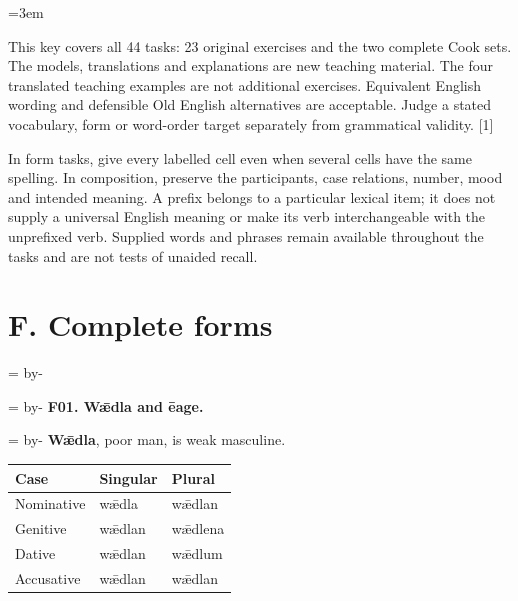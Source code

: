 \BookRecto
\begingroup
\renewcommand{\runningtitle}{Unit 14. Answer key}
\emergencystretch=3em
\newcommand{\itempara}[2]{\par\addvspace{3pt}\noindent\hangindent=1.8em\hangafter=1\makebox[1.8em][l]{#1.}#2\par}
\newcommand{\reserve}[1]{\par\penalty-100\begingroup\dimen0=\pagegoal\advance\dimen0 by-\pagetotal\ifdim\dimen0<#1\newpage\fi\endgroup}

\raggedright
{}

This key covers all 44 tasks: 23 original exercises and the two complete Cook sets. The models, translations and explanations are new teaching material. The four translated teaching examples are not additional exercises. Equivalent English wording and defensible Old English alternatives are acceptable. Judge a stated vocabulary, form or word-order target separately from grammatical validity. [1]

In form tasks, give every labelled cell even when several cells have the same spelling. In composition, preserve the participants, case relations, number, mood and intended meaning. A prefix belongs to a particular lexical item; it does not supply a universal English meaning or make its verb interchangeable with the unprefixed verb. Supplied words and phrases remain available throughout the tasks and are not tests of unaided recall.

\clearpage
\section*{F. Complete forms}

\reserve{5\baselineskip}
\reserve{8\baselineskip}
\textbf{F01. Wǣdla and ēage.}

\reserve{11\baselineskip}
\textbf{Wǣdla}, poor man, is weak masculine.

\par\begingroup
\fontsize{10.5}{13.2}\selectfont
\setlength{\LTleft}{0pt}\setlength{\LTright}{\fill}
\noindent
\begin{tabular}{@{}>{\raggedright\arraybackslash}p{39.46mm}>{\raggedright\arraybackslash}p{39.46mm}>{\raggedright\arraybackslash}p{39.46mm}@{}}
\toprule
\textbf{Case} & \textbf{Singular} & \textbf{Plural} \\
\midrule
Nominative & wǣdla & wǣdlan \\
Genitive & wǣdlan & wǣdlena \\
Dative & wǣdlan & wǣdlum \\
Accusative & wǣdlan & wǣdlan \\
\bottomrule
\end{tabular}
\par\endgroup

